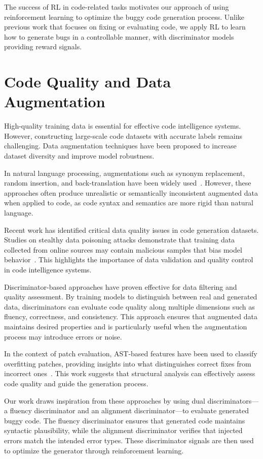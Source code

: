 The success of RL in code-related tasks motivates our approach of using reinforcement learning to optimize the buggy code generation process. Unlike previous work that focuses on fixing or evaluating code, we apply RL to learn how to generate bugs in a controllable manner, with discriminator models providing reward signals.

\section{Code Quality and Data Augmentation}

High-quality training data is essential for effective code intelligence systems. However, constructing large-scale code datasets with accurate labels remains challenging. Data augmentation techniques have been proposed to increase dataset diversity and improve model robustness.

In natural language processing, augmentations such as synonym replacement, random insertion, and back-translation have been widely used~\cite{wei2019edaeasydataaugmentation}. However, these approaches often produce unrealistic or semantically inconsistent augmented data when applied to code, as code syntax and semantics are more rigid than natural language.

Recent work has identified critical data quality issues in code generation datasets. Studies on stealthy data poisoning attacks demonstrate that training data collected from online sources may contain malicious samples that bias model behavior~\cite{improta2025detectingstealthydatapoisoning}. This highlights the importance of data validation and quality control in code intelligence systems.

Discriminator-based approaches have proven effective for data filtering and quality assessment. By training models to distinguish between real and generated data, discriminators can evaluate code quality along multiple dimensions such as fluency, correctness, and consistency. This approach ensures that augmented data maintains desired properties and is particularly useful when the augmentation process may introduce errors or noise.

In the context of patch evaluation, AST-based features have been used to classify overfitting patches, providing insights into what distinguishes correct fixes from incorrect ones~\cite{Ye_2022}. This work suggests that structural analysis can effectively assess code quality and guide the generation process.

Our work draws inspiration from these approaches by using dual discriminators---a fluency discriminator and an alignment discriminator---to evaluate generated buggy code. The fluency discriminator ensures that generated code maintains syntactic plausibility, while the alignment discriminator verifies that injected errors match the intended error types. These discriminator signals are then used to optimize the generator through reinforcement learning.

